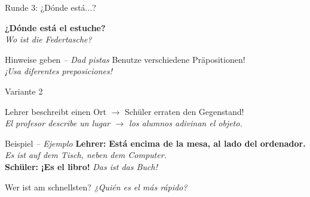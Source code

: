 \documentclass[aspectratio=169, 11pt]{beamer}
\newcommand{\es}[1]{\textbf{\textcolor{spanischrot}{#1}}}
\newcommand{\de}[1]{{\small\textcolor{dunkelgrau}{\textit{#1}}}}
\newcommand{\estar}[1]{\textbf{\textcolor{blau}{#1}}}
\begin{document}
\begin{frame}{Runde 3: ¿Dónde está...?}

\begin{center}
{\Huge\bfseries \estar{¿Dónde está el estuche?}}\\[0.3em]
{\large\textcolor{dunkelgrau}{\textit{Wo ist die Federtasche?}}}
\end{center}

\vspace{0.8cm}

\begin{block}{Hinweise geben \de{-- Dad pistas}}
Benutze verschiedene Präpositionen!\\
{\footnotesize\textcolor{dunkelgrau}{\textit{¡Usa diferentes preposiciones!}}}
\end{block}

\end{frame}

\begin{frame}{Variante 2}

\begin{center}
{\Large Lehrer beschreibt einen Ort $\rightarrow$ Schüler erraten den Gegenstand!}\\[0.3em]
{\normalsize\textcolor{dunkelgrau}{\textit{El profesor describe un lugar $\rightarrow$ los alumnos adivinan el objeto.}}}
\end{center}

\vspace{0.6cm}

\begin{block}{Beispiel \de{-- Ejemplo}}
\textbf{Lehrer:} \estar{Está encima de la mesa, al lado del ordenador.}\\
{\footnotesize\textcolor{dunkelgrau}{\textit{Es ist auf dem Tisch, neben dem Computer.}}}\\[0.5em]
\textbf{Schüler:} \es{¡Es el libro!} \de{Das ist das Buch!}
\end{block}

\vspace{0.4cm}

\begin{center}
{\large Wer ist am schnellsten? \textcolor{dunkelgrau}{\textit{¿Quién es el más rápido?}}}
\end{center}

\end{frame}
\end{document}
